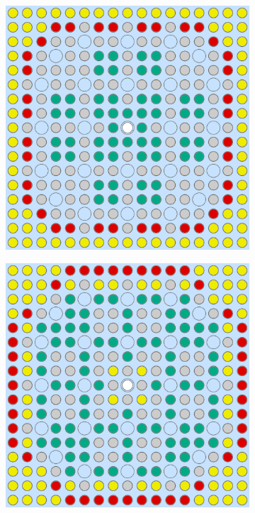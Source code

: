 \begin{appendices}
\begin{figure}[h!]
\centering
\begin{subfigure}{0.48\textwidth}
  \centering
  \includegraphics[width=0.95\linewidth]{figures/unsupervised/geometries/dimension-reduce/assm-16/no-reduce}
  \caption{}
  \label{fig:assm-16-combined-no-reduce}
\end{subfigure}%
\begin{subfigure}{0.48\textwidth}
  \centering
  \includegraphics[width=0.95\linewidth]{figures/unsupervised/geometries/dimension-reduce/assm-16/pca}

\end{subfigure}
\end{figure}
\end{appendices}
